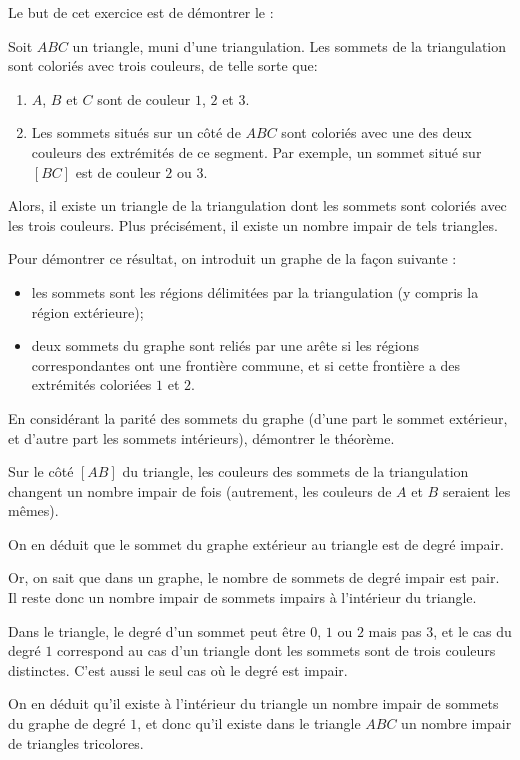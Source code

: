 \begin{exo}
Le but de cet exercice est de démontrer le :
\begin{theoreme}
Soit $ABC$ un triangle, muni d'une triangulation. Les sommets de la triangulation sont coloriés avec trois couleurs, de telle sorte que:
\begin{enumerate}
\item $A$, $B$ et $C$ sont de couleur $1$, $2$ et $3$.
\item Les sommets situés sur un côté de $ABC$ sont coloriés avec une des deux couleurs des extrémités de ce segment. Par exemple, un sommet situé sur $[BC]$ est de couleur $2$ ou $3$.
\end{enumerate}
Alors, il existe un triangle de la triangulation dont les sommets sont coloriés avec les trois couleurs. Plus précisément, il existe un nombre impair de tels triangles.
\end{theoreme}

Pour démontrer ce résultat, on introduit un graphe de la façon suivante : 
\begin{itemize}
\item les sommets sont les régions délimitées par la triangulation (y compris la région extérieure);
\item deux sommets du graphe sont reliés par une arête si les régions correspondantes ont une frontière commune, et si cette frontière a des extrémités coloriées $1$ et $2$.
\end{itemize}
En considérant la parité des sommets du graphe (d'une part le sommet extérieur, et d'autre part les sommets intérieurs), démontrer le théorème.
\begin{sol}
Sur le côté $[AB]$ du triangle, les couleurs des sommets de la triangulation changent un nombre impair de fois (autrement, les couleurs de $A$ et $B$ seraient les mêmes).

On en déduit que le sommet du graphe extérieur au triangle est de degré impair.

Or, on sait que dans un graphe, le nombre de sommets de degré impair est pair. Il reste donc un nombre impair de sommets impairs à l'intérieur du triangle.

Dans le triangle, le degré d'un sommet peut être $0$, $1$ ou $2$ mais pas $3$, et le cas du degré $1$ correspond au cas d'un triangle dont les sommets sont de trois couleurs distinctes. C'est aussi le seul cas où le degré est impair.

On en déduit qu'il existe à l'intérieur du triangle un nombre impair de sommets du graphe de degré $1$, et donc qu'il existe dans le triangle $ABC$ un nombre impair de triangles tricolores.
\end{sol}
\end{exo}


